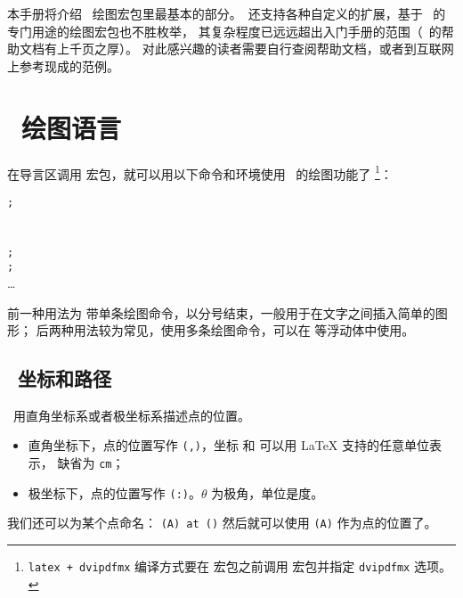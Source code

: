 本手册将介绍 \TikZ\ 绘图宏包里最基本的部分。\TikZ\ 还支持各种自定义的扩展，基于 \TikZ\ 的专门用途的绘图宏包也不胜枚举，
其复杂程度已远远超出入门手册的范围（\TikZ\ 的帮助文档有上千页之厚）。
对此感兴趣的读者需要自行查阅帮助文档，或者到互联网上参考现成的范例。

\section{\TikZ\ 绘图语言}\label{sec:tikz}

在导言区调用  宏包，就可以用以下命令和环境使用 \TikZ\ 的绘图功能了%
\footnote{\texttt{latex + dvipdfmx} 编译方式要在  宏包之前调用  宏包并指定 \texttt{dvipdfmx} 选项。}：
\begin{command}
\oarg*{\ldots} \texttt{;} \\[1ex]
\oarg*{\ldots}  \\[1ex]
\oarg*{\ldots} \\
\texttt{;} \\
\texttt{;} \\
\ldots \\
\end{command}

前一种用法为  带单条绘图命令，以分号结束，一般用于在文字之间插入简单的图形；
后两种用法较为常见，使用多条绘图命令，可以在  等浮动体中使用。

\subsection{\TikZ\ 坐标和路径}\label{subsec:tikz-path}

\TikZ\ 用直角坐标系或者极坐标系描述点的位置。
\begin{itemize}
  \item 直角坐标下，点的位置写作 \texttt{(,)}，坐标  和  可以用 \LaTeX{} 支持的任意单位表示，
  缺省为 \texttt{cm}；
  \item 极坐标下，点的位置写作 \texttt{(\Arg{$\theta$}:)}。$\theta$ 为极角，单位是度。
\end{itemize}

我们还可以为某个点命名： \texttt{(A) at ()}
然后就可以使用 \texttt{(A)} 作为点的位置了。

